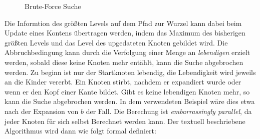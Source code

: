 \begin{figure}[ht]
  \caption{Brute-Force Suche}
  \label{ch:fig:brute_force_suchbaum}
\end{figure}

Die Informtion des größten Levels auf dem Pfad zur Wurzel kann dabei beim Update eines Kontens übertragen werden, indem das Maximum des bisherigen größten Levels und das Level des upgedateten Knoten gebildet wird.
Die Abbruchbedingung kann durch die Verfolgung einer Menge an \emph{lebendigen} erzielt werden, sobald diese keine Knoten mehr entählt, kann die Suche abgebrochen werden.
Zu beginn ist nur der Startknoten lebendig, die Lebendigkeit wird jeweils an die Kinder vererbt.
Ein Knoten stirbt, nachdem er expandiert wurde oder wenn er den Kopf einer Kante bildet.
Gibt es keine lebendigen Knoten mehr, so kann die Suche abgebrochen werden.
In dem verwendeten Beispiel wäre dies etwa nach der Expansion von $b$ der Fall.
Die Berechung ist \emph{embarrassingly parallel}, da jeder Knoten für sich selbst Berechnet werden kann.
Der textuell beschriebene Algorithmus wird dann wie folgt formal definiert:

